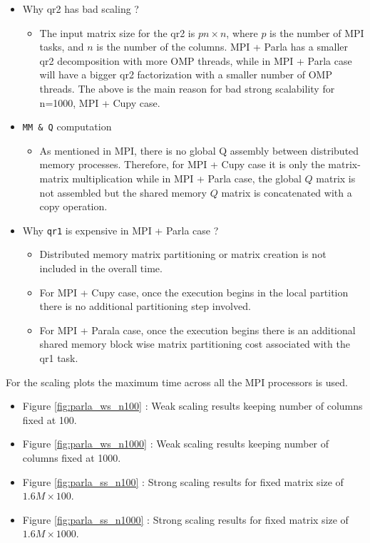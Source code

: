 \documentclass{article}
\begin{document}
\begin{itemize}
    \item Why qr2 has bad scaling ? 
    \begin{itemize}
        \item The input matrix size for the qr2 is $pn\times n$, where $p$ is the number of MPI tasks, and $n$ is the number of the columns. MPI + Parla has a smaller qr2 decomposition with more OMP threads, while in MPI + Parla case will have a bigger qr2 factorization with a smaller number of OMP threads. The above is the main reason for bad strong scalability for n=1000, MPI + Cupy case. 
    \end{itemize}
    \item \texttt{MM \& Q} computation 
    \begin{itemize}
        \item As mentioned in MPI, there is no global Q assembly between distributed memory processes. Therefore, for MPI + Cupy case it is only the matrix-matrix multiplication while in MPI + Parla case, the global $Q$ matrix is not assembled but the shared memory $Q$ matrix is concatenated with a copy operation. 
    \end{itemize}
    \item Why \texttt{qr1} is expensive in MPI + Parla case ? 
    \begin{itemize}
        \item Distributed memory matrix partitioning or matrix creation is not included in the overall time. 
        \item For MPI + Cupy case, once the execution begins in the local partition there is no additional partitioning step involved. 
        \item For MPI + Parala case, once the execution begins there is an additional shared memory block wise matrix partitioning cost associated with the qr1 task. 
    \end{itemize}
\end{itemize}

For the scaling plots the maximum time across all the MPI processors is used. 

\begin{itemize}
    \item Figure \ref{fig:parla_ws_n100} : Weak scaling results keeping number of columns fixed at 100.
    \item Figure \ref{fig:parla_ws_n1000} : Weak scaling results keeping number of columns fixed at 1000.
    \item Figure \ref{fig:parla_ss_n100} : Strong scaling results for fixed matrix size of $1.6M\times 100$.
    \item Figure \ref{fig:parla_ss_n1000} : Strong scaling results for fixed matrix size of $1.6M\times 1000$.
\end{itemize}
\end{document}
